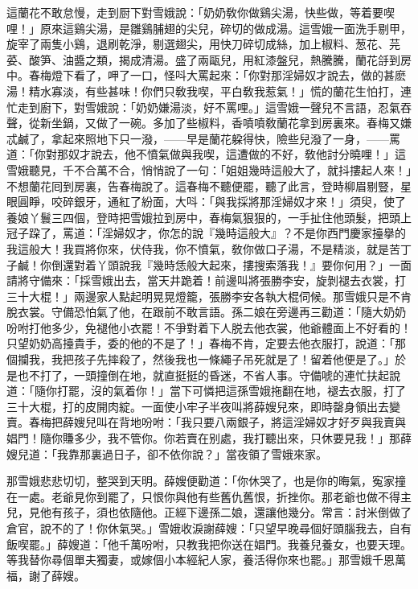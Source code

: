 這蘭花不敢怠慢，走到厨下對雪娥說：「奶奶敎你做鷄尖湯，快些做，等着要喫哩！」原來這鷄尖湯，是雛鷄脯翅的尖兒，碎切的做成湯。這雪娥一面洗手剔甲，旋宰了兩隻小鷄，退刷乾淨，剔選翅尖，用快刀碎切成絲，加上椒料、葱花、芫荽、酸笋、油醬之類，揭成清湯。盛了兩甌兒，用紅漆盤兒，熱騰騰，蘭花㧱到房中。春梅燈下看了，呷了一口，怪呌大罵起來：「你對那淫婦奴才說去，做的甚麽湯！精水寡淡，有些甚味！你們只敎我喫，平白敎我惹氣！」慌的蘭花生怕打，連忙走到廚下，對雪娥說：「奶奶嫌湯淡，好不罵哩。」這雪娥一聲兒不言語，忍氣吞聲，從新坐鍋，又做了一碗。多加了些椒料，香噴噴敎蘭花拿到房裏來。春梅又嫌忒鹹了，拿起來照地下只一潑，——早是蘭花躱得快，險些兒潑了一身，——罵道：「你對那奴才說去，他不憤氣做與我喫，這遭做的不好，敎他討分曉哩！」這雪娥聽見，千不合萬不合，悄悄說了一句：「姐姐幾時這般大了，就抖摟起人來！」不想蘭花囘到房裏，告春梅說了。這春梅不聽便罷，聽了此言，登時柳眉剔豎，星眼圓睜，咬碎銀牙，通紅了紛面，大呌：「與我採將那淫婦奴才來！」須臾，使了養娘丫鬟三四個，登時把雪娥拉到房中，春梅氣狠狠的，一手扯住他頭髮，把頭上冠子跥了，罵道：「淫婦奴才，你怎的說『幾時這般大』？不是你西門慶家擡擧的我這般大！我買將你來，伏侍我，你不憤氣，敎你做口子湯，不是精淡，就是苦丁子鹹！你倒還對着丫頭說我『幾時恁般大起來，摟搜索落我！』要你何用？」一面請將守備來：「採雪娥出去，當天井跪着！前邊叫將張勝李安，旋剝褪去衣裳，打三十大棍！」兩邊家人點起明晃晃燈籠，張勝李安各執大棍伺候。那雪娥只是不肯脫衣裳。守備恐怕氣了他，在跟前不敢言語。孫二娘在旁邊再三勸道：「隨大奶奶吩咐打他多少，免褪他小衣罷！不爭對着下人脱去他衣裳，他爺體面上不好看的！只望奶奶高擡貴手，委的他的不是了！」春梅不肯，定要去他衣服打，說道：「那個攔我，我把孩子先摔殺了，然後我也一條繩子吊死就是了！留着他便是了。」於是也不打了，一頭撞倒在地，就直挺挺的昏迷，不省人事。守備唬的連忙扶起說道：「隨你打罷，沒的氣着你！」當下可憐把這孫雪娥拖翻在地，褪去衣服，打了三十大棍，打的皮開肉綻。一面使小牢子半夜叫將薛嫂兒來，即時罄身領出去變賣。春梅把薛嫂兒叫在背地吩咐：「我只要八兩銀子，將這淫婦奴才好歹與我賣與娼門！隨你賺多少，我不管你。你若賣在别處，我打聽出來，只休要見我！」那薛嫂兒道：「我靠那裏過日子，卻不依你說？」當夜領了雪娥來家。

那雪娥悲悲切切，整哭到天明。薛嫂便勸道：「你休哭了，也是你的晦氣，寃家撞在一處。老爺見你到罷了，只恨你與他有些舊仇舊恨，折挫你。那老爺也做不得主兒，見他有孩子，須也依隨他。正經下邊孫二娘，還讓他幾分。常言：討米倒做了倉官，說不的了！你休氣哭。」雪娥收淚謝薛嫂：「只望早晚尋個好頭腦我去，自有飯喫罷。」薛嫂道：「他千萬吩咐，只教我把你送在娼門。我養兒養女，也要天理。等我替你尋個單夫獨妻，或嫁個小本經紀人家，養活得你來也罷。」那雪娥千恩萬福，謝了薛嫂。

